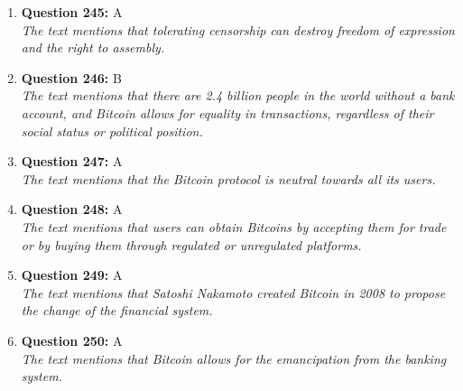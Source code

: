 \documentclass[12pt,a4paper]{article}
\begin{document}
\begin{enumerate}
\item \textbf{Question 245:} A
\\ \textit{The text mentions that tolerating censorship can destroy freedom of expression and the right to assembly.}

\item \textbf{Question 246:} B
\\ \textit{The text mentions that there are 2.4 billion people in the world without a bank account, and Bitcoin allows for equality in transactions, regardless of their social status or political position.}

\item \textbf{Question 247:} A
\\ \textit{The text mentions that the Bitcoin protocol is neutral towards all its users.}

\item \textbf{Question 248:} A
\\ \textit{The text mentions that users can obtain Bitcoins by accepting them for trade or by buying them through regulated or unregulated platforms.}

\item \textbf{Question 249:} A
\\ \textit{The text mentions that Satoshi Nakamoto created Bitcoin in 2008 to propose the change of the financial system.}

\item \textbf{Question 250:} A
\\ \textit{The text mentions that Bitcoin allows for the emancipation from the banking system.}


\end{enumerate}
\end{document}
